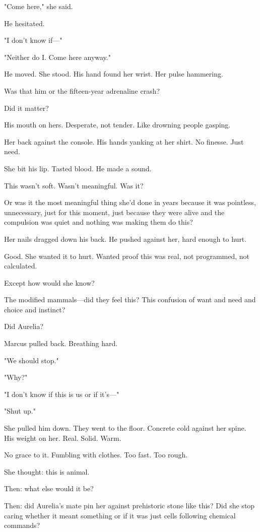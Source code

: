 "Come here," she said.

He hesitated.

"I don't know if—"

"Neither do I. Come here anyway."

He moved. She stood. His hand found her wrist. Her pulse hammering.

Was that him or the fifteen-year adrenaline crash?

Did it matter?

His mouth on hers. Desperate, not tender. Like drowning people gasping.

Her back against the console. His hands yanking at her shirt. No finesse. Just need.

She bit his lip. Tasted blood. He made a sound.

This wasn't soft. Wasn't meaningful. Was it?

Or was it the most meaningful thing she'd done in years because it was pointless, unnecessary, just for this moment, just because they were alive and the compulsion was quiet and nothing was making them do this?

Her nails dragged down his back. He pushed against her, hard enough to hurt.

Good. She wanted it to hurt. Wanted proof this was real, not programmed, not calculated.

Except how would she know?

The modified mammals—did they feel this? This confusion of want and need and choice and instinct?

Did Aurelia?

Marcus pulled back. Breathing hard.

"We should stop."

"Why?"

"I don't know if this is us or if it's—"

"Shut up."

She pulled him down. They went to the floor. Concrete cold against her spine. His weight on her. Real. Solid. Warm.

No grace to it. Fumbling with clothes. Too fast. Too rough.

She thought: this is animal.

Then: what else would it be?

Then: did Aurelia's mate pin her against prehistoric stone like this? Did she stop caring whether it meant something or if it was just cells following chemical commands?


